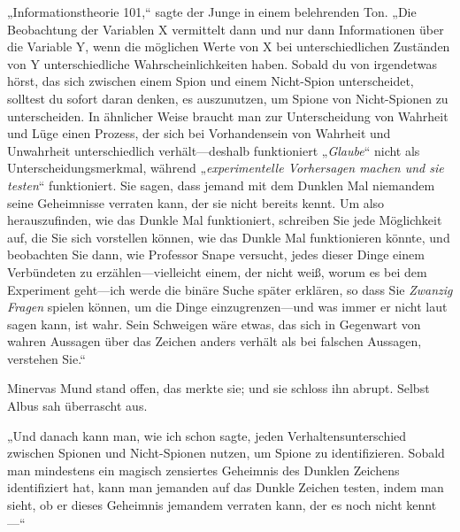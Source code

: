 „Informationstheorie 101,“ sagte der Junge in einem belehrenden Ton. „Die Beobachtung der Variablen X vermittelt dann und nur dann Informationen über die Variable Y, wenn die möglichen Werte von X bei unterschiedlichen Zuständen von Y unterschiedliche Wahrscheinlichkeiten haben. Sobald du von irgendetwas hörst, das sich zwischen einem Spion und einem Nicht-Spion unterscheidet, solltest du sofort daran denken, es auszunutzen, um Spione von Nicht-Spionen zu unterscheiden. In ähnlicher Weise braucht man zur Unterscheidung von Wahrheit und Lüge einen Prozess, der sich bei Vorhandensein von Wahrheit und Unwahrheit unterschiedlich verhält—deshalb funktioniert „\emph{Glaube}“ nicht als Unterscheidungsmerkmal, während „\emph{experimentelle Vorhersagen machen und sie testen}“ funktioniert. Sie sagen, dass jemand mit dem Dunklen Mal niemandem seine Geheimnisse verraten kann, der sie nicht bereits kennt. Um also herauszufinden, wie das Dunkle Mal funktioniert, schreiben Sie jede Möglichkeit auf, die Sie sich vorstellen können, wie das Dunkle Mal funktionieren könnte, und beobachten Sie dann, wie Professor Snape versucht, jedes dieser Dinge einem Verbündeten zu erzählen—vielleicht einem, der nicht weiß, worum es bei dem Experiment geht—ich werde die binäre Suche später erklären, so dass Sie \emph{Zwanzig Fragen} spielen können, um die Dinge einzugrenzen—und was immer er nicht laut sagen kann, ist wahr. Sein Schweigen wäre etwas, das sich in Gegenwart von wahren Aussagen über das Zeichen anders verhält als bei falschen Aussagen, verstehen Sie.“

Minervas Mund stand offen, das merkte sie; und sie schloss ihn abrupt. Selbst Albus sah überrascht aus.

„Und danach kann man, wie ich schon sagte, jeden Verhaltensunterschied zwischen Spionen und Nicht-Spionen nutzen, um Spione zu identifizieren. Sobald man mindestens ein magisch zensiertes Geheimnis des Dunklen Zeichens identifiziert hat, kann man jemanden auf das Dunkle Zeichen testen, indem man sieht, ob er dieses Geheimnis jemandem verraten kann, der es noch nicht kennt—“


